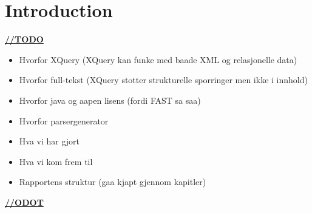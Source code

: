\chapter{Introduction}
\underline{\textbf{\LARGE //TODO}}

\begin{itemize}
\item Hvorfor XQuery (XQuery kan funke med baade XML og relasjonelle data)
\item Hvorfor full-tekst (XQuery stotter strukturelle sporringer men ikke i innhold)
\item Hvorfor java og aapen lisens (fordi FAST sa saa)
\item Hvorfor parsergenerator
\item Hva vi har gjort
\item Hva vi kom frem til
\item Rapportens struktur (gaa kjapt gjennom kapitler)
\end{itemize}

\underline{\textbf{\LARGE //ODOT}}